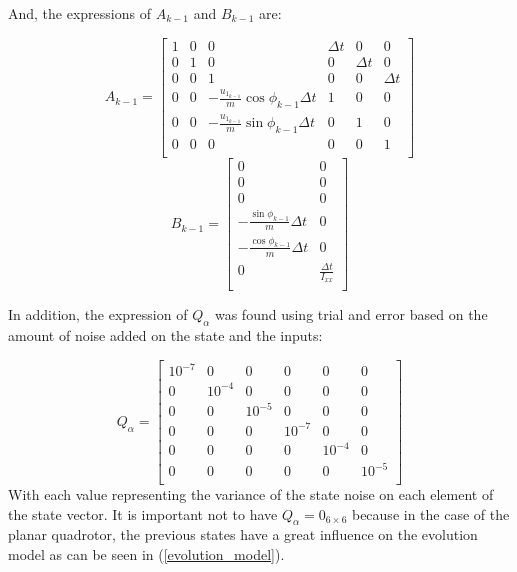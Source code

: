 \documentclass{thesisreport}
\begin{document}
And, the expressions of $A_{k-1}$ and $B_{k-1}$ are:

\begin{equation}
        A_{k-1} = \begin{bmatrix}
                1 & 0 & 0 & \Delta t  & 0 & 0 \\
                0 & 1 & 0 & 0  & \Delta t & 0 \\
                0 & 0 & 1 & 0 & 0 & \Delta t \\
                0 & 0 & -\frac{u_{1_{k-1}}}{m} \cos \phi_{k-1} \Delta t & 1 & 0 & 0 \\
                0 & 0 & -\frac{u_{1_{k-1}}}{m} \sin \phi_{k-1} \Delta t & 0 & 1 & 0 \\
                0 & 0 & 0 & 0 & 0 & 1 \\
            \end{bmatrix}
    \end{equation}
    \begin{equation}
        B_{k-1} = \begin{bmatrix}
            0 & 0 \\
            0 & 0 \\
            0 & 0 \\
            - \frac{\sin \phi_{k-1}}{m} \Delta t & 0 \\
            - \frac{\cos \phi_{k-1}}{m} \Delta t & 0 \\
            0 & \frac{\Delta t}{I_{xx}} \\
        \end{bmatrix}
    \end{equation}
    
In addition, the expression of $Q_{\alpha}$ was found using trial and error based on the amount of noise added on the state and the inputs:

\begin{equation}
        Q_{\alpha} = \begin{bmatrix}
                10^{-7} & 0 & 0 & 0  & 0 & 0 \\
                0 & 10^{-4} & 0 & 0  & 0 & 0 \\
                0 & 0 & 10^{-5} & 0 & 0 & 0 \\
                0 & 0 & 0 & 10^{-7} & 0 & 0 \\
                0 & 0 & 0 & 0 & 10^{-4} & 0 \\
                0 & 0 & 0 & 0 & 0 & 10^{-5} \\
            \end{bmatrix}
\end{equation}
With each value representing the variance of the state noise on each element of the state vector. It is important not to have $Q_{\alpha}=0_{6 \times 6}$ because in the case of the planar quadrotor, the previous states have a great influence on the evolution model as can be seen in (\ref{evolution_model}).
\end{document}
